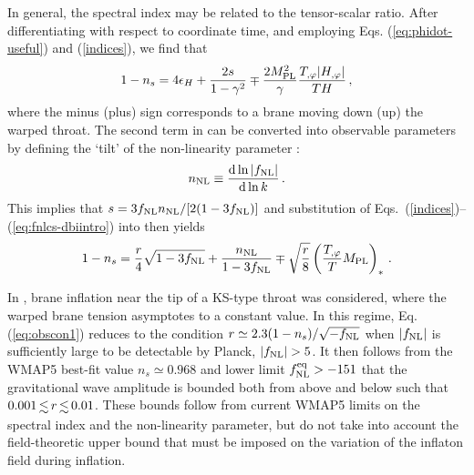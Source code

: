 In general, the spectral index may be related to the tensor-scalar ratio. 
After differentiating  
with respect to coordinate time, and employing Eqs. (\ref{eq:phidot-useful}) 
and (\ref{indices}), we find that\footnotemark
% 
\begin{equation}
\label{eq:nsconstraint}
1-n_s = 4 \epsilon_H +\frac{2s}{1-\gamma^2} \mp 
\frac{2M_{\mathrm{PL}}^2}{\gamma} \frac{T_{,\varphi}|H_{,\varphi}|}{TH}  \,,
\end{equation}
% 
where the minus (plus) sign corresponds to 
a brane moving down (up) the warped throat.
%  
% 
The second term in 
can be converted into observable parameters
by defining the `tilt' of the non-linearity parameter  \cite{brane14}: 
% 
\begin{equation}
\label{eq:nnl-defn-dbi}
n_{\mathrm{NL}} \equiv \frac{\mathrm{d} \ln |f_{\mathrm{NL}}|}{\mathrm{d}\ln k}\,. 
\end{equation}
% 
This implies that $s=  3 f_{\mathrm{NL}} n_{\mathrm{NL}} /[2(1-3f_{\mathrm{NL}})]$ and     
substitution of Eqs.~(\ref{indices})--(\ref{eq:fnlcs-dbiintro}) 
into  then yields
% 
\begin{equation}
\label{eq:obscon1}
1-n_s = \frac{r}{4} \sqrt{1-3f_{\mathrm{NL}}} + \frac{n_{\mathrm{NL}}}{1-3f_{\mathrm{NL}}}
\mp \sqrt{\frac{r}{8}} \left( \frac{T_{,\varphi}}{T} M_{\mathrm{PL}} \right)_*  \,.
\end{equation}
% 


In , brane inflation near the tip of a KS-type 
throat was considered, where the warped brane tension asymptotes to a 
constant value. In this regime, Eq. (\ref{eq:obscon1}) reduces to 
the condition $r \simeq 2.3 (1-n_s)/\sqrt{-f_{\mathrm{NL}}}$ when $|f_{\mathrm{NL}}|$ is 
sufficiently large to be detectable by Planck, 
\ie $|f_{\mathrm{NL}}| > 5$. 
It then follows from the  
WMAP5 best-fit value $n_s \simeq 0.968$ and lower limit 
$f_{\mathrm{NL}}^{\mathrm{eq}} > -151$ \cite{Komatsu:2008hk} that the gravitational wave amplitude 
is bounded both from above and below such that $0.001 \, \lsim \, r 
\, \lsim \, 0.01$. These bounds follow from 
current WMAP5 limits on the spectral index and the 
non-linearity parameter, but do not take into account the 
field-theoretic upper bound that must be imposed 
on the variation of the inflaton field during inflation. 


